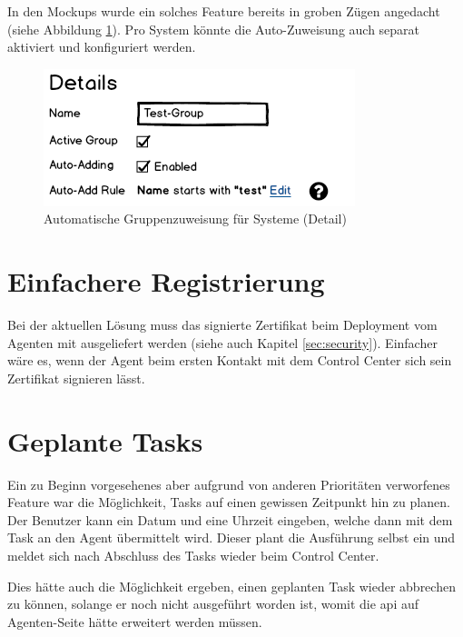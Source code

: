 In den Mockups wurde ein solches Feature bereits in groben Zügen angedacht (siehe Abbildung \ref{fig:ergebnis:group_systems_detail}). Pro System könnte die Auto-Zuweisung auch separat aktiviert und konfiguriert werden.

\begin{figure}
    \centering
    \includegraphics{files/mockups/group_systems_detail}
    \caption{Automatische Gruppenzuweisung für Systeme (Detail)}
    \label{fig:ergebnis:group_systems_detail}
\end{figure}

\section{Einfachere Registrierung}
\label{sec:ausblick:simple_registration}

Bei der aktuellen Lösung muss das signierte Zertifikat beim Deployment vom Agenten mit ausgeliefert werden (siehe auch Kapitel \ref{sec:security}). Einfacher wäre es, wenn der Agent beim ersten Kontakt mit dem Control Center sich sein Zertifikat signieren lässt.

\xxx[ korrekt? ]

\section{Geplante Tasks}
\label{sec:ausblick:scheduled_tasks}

Ein zu Beginn vorgesehenes aber aufgrund von anderen Prioritäten verworfenes Feature war die Möglichkeit, Tasks auf einen gewissen Zeitpunkt hin zu planen. Der Benutzer kann ein Datum und eine Uhrzeit eingeben, welche dann mit dem Task an den Agent übermittelt wird. Dieser plant die Ausführung selbst ein und meldet sich nach Abschluss des Tasks wieder beim Control Center.

Dies hätte auch die Möglichkeit ergeben, einen geplanten Task wieder abbrechen zu können, solange er noch nicht ausgeführt worden ist, womit die \gls{api} auf Agenten-Seite hätte erweitert werden müssen.

